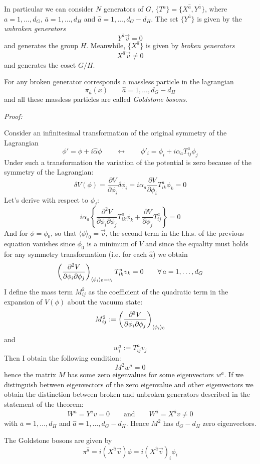 \documentclass[TheoreticalPhy_ModB.tex]{subfiles}
\begin{document}
In particular we can consider $N$ generators of $G$, $\{T^a\}=\{X^{\hat a},Y^{\bar a}\}$, where $a=1,\dots,d_G$, $\bar a=1,\dots,d_H$ and $\hat a=1,\dots,d_G-d_H$. The set $\{Y^{\bar a}\}$ is given by the \emph{unbroken generators}
\[Y^{\bar a}\vec v=0\]
and generates the group $H$. Meanwhile, $\{X^{\hat a}\}$ is given by \emph{broken generators}
\[X^{\hat a}\vec v\neq0\]
and generates the coset $G/H$.

For any broken generator corresponds a massless particle in the lagrangian
\[\pi_{\hat a}(x)\qquad\hat a=1,\dots,d_G-d_H\]
and all these massless particles are called \emph{Goldstone bosons}.
\skipline

\noindent
\textit{Proof:}

Consider an infinitesimal transformation of the original symmetry of the Lagrangian 
\[
\phi'=\phi+i\hat\alpha\phi
\qquad\longleftrightarrow\qquad
\phi'_i=\phi_i+i\alpha_aT^a_{ij}\phi_j
\]
Under such a transformation the variation of the potential is zero because of the symmetry of the Lagrangian:
\[\delta V(\phi)=\frac{\partial V}{\partial\phi_i}\delta\phi_i=i\alpha_a\frac{\partial V}{\partial\phi_i}T^a_{ik}\phi_k=0\]
Let's derive with respect to $\phi_j$:
\[i\alpha_a\left\{\frac{\partial^2V}{\partial\phi_i\partial\phi_j}T^a_{ik}\phi_k+\frac{\partial V}{\partial\phi_j}T^a_{ij}\right\}=0\]
And for $\phi=\phi_0$, so that $\langle\phi\rangle_0=\vec v$, the second term in the l.h.s. of the previous equation vanishes since $\phi_0$ is a minimum of $V$ and since the equality must holds for any symmetry transformation (i.e. for each $\hat a$) we obtain
\[\left(\frac{\partial^2V}{\partial\phi_i\partial\phi_j}\right)_{\langle\phi_i\rangle_0=v_i}T^a_{ik}v_k=0\qquad\forall\,a=1,\dots,d_G\]
I define the mass term $M_{ij}^2$ as the coefficient of the quadratic term in the expansion of $V(\phi)$ about the vacuum state:
\[M_{ij}^2:=\left(\frac{\partial^2V}{\partial\phi_i\partial\phi_j}\right)_{\langle\phi_i\rangle_0}\]
and
\[w_i^a:=T_{ij}^av_j\]
Then I obtain the following condition:
\[M^2w^a=0\]
hence the matrix $M$ has some zero eigenvalues for some eigenvectors $w^a$.
If we distinguish between eigenvectors of the zero eigenvalue and  other eigenvectors we obtain the distinction between broken and unbroken generators described in the statement of the theorem:
\[W^{\bar a}=Y^{\bar a}v=0\qquad\text{and}\qquad W^{\hat a}=X^{\hat a}v\neq0\]
with $\bar a=1,\dots,d_H$ and $\hat a=1,\dots,d_G-d_H$. Hence $M^2$ has $d_G-d_H$ zero eigenvectors. 

The Goldstone bosons are given by
\[\pi^{\hat a}=i(X^{\hat a}\vec v)\phi=i(X^{\hat a}\vec v)_i\phi_i\]
\end{document}
